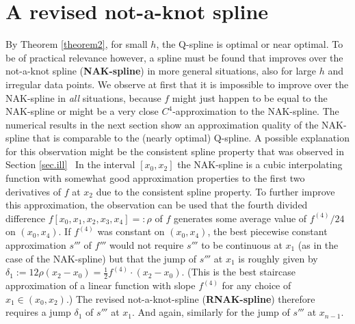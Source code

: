 \documentclass[12pt]{article}
\begin{document}
\section{A revised not-a-knot spline}\label{sec.revised}
By Theorem \ref{theorem2}, for small $h$, the Q-spline is optimal or
near optimal. To be of practical relevance however, a spline must be
found that improves over the not-a-knot spline
({\bf NAK-spline}) in more general situations,
also for large $h$ and irregular data points.
We observe at first that it is impossible to improve over the NAK-spline
in {\em all} situations, because $f$ might just
happen to be equal to the NAK-spline
or might be a very close $C^4$-approximation to the NAK-spline.
The numerical results in the next section show an  
approximation quality of the 
NAK-spline that is comparable to the (nearly optimal)
Q-spline. A possible explanation for this observation might be
the consistent spline property that was observed in Section \ref{sec.ill} \
In the interval $[x_0,x_2]$ the NAK-spline is a cubic interpolating
function with somewhat good approximation properties 
to the first two derivatives of $f$ at $x_2$ due to the consistent
spline property.
To further improve this approximation, the observation can be used that
the fourth divided difference $f[x_0,x_1,x_2,x_3,x_4]=:\rho$
of $f$ generates some average value of $f^{(4)}/24$ on  $(x_0,x_4)$.
If $f^{(4)}$ was constant on $(x_0,x_4)$, the best piecewise
constant approximation $s'''$ of $f'''$ would not require 
$s'''$ to be continuous at $x_1$ (as in the case of the NAK-spline)
but that the jump of $s'''$ at $x_1$ is roughly
given by $\delta_1:=12 \rho  (x_2-x_0)=\tfrac 12 f^{(4)}\cdot (x_2-x_0) $.
(This is the best staircase approximation of a linear function with
slope $f^{(4)}$ for any choice of $x_1\in(x_0,x_2)$.)
The revised not-a-knot-spline ({\bf RNAK-spline})
therefore requires a jump $\delta_1$ of $s'''$ at $x_1$.
And again, similarly for the jump of $s'''$  at $x_{n-1}$.
\end{document}
